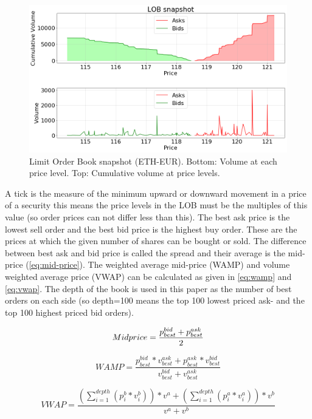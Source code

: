 \documentclass[11pt,a4paper,oneside]{article}
\begin{document}
  \begin{figure}[tbh]
    \centering
    \includegraphics[width=\textwidth]{lob_snapshot.png}
    \caption{Limit Order Book snapshot (ETH-EUR). Bottom: Volume at each price level. Top: Cumulative volume at price levels.}
    \label{fig:1}
  \end{figure}

  A tick is the measure of the minimum upward or downward movement in a price of a security this means the price levels 
  in the LOB must be the multiples of this value (so order prices can not differ less than this). The best ask price is 
  the lowest sell order and the best bid price is the highest buy order. These are the prices at which the given number 
  of shares can be bought or sold. The difference between best ask and bid price is called the spread and their average 
  is the mid-price (\ref{eq:mid-price}). The weighted average mid-price (WAMP) and volume weighted average price (VWAP) 
  can be calculated as given in \autoref{eq:wamp} and \autoref{eq:vwap}. The depth of the book is used in this paper as 
  the number of best orders on each side (so depth=100 means the top 100 lowest priced ask- and the top 100 highest 
  priced bid orders).

  \begin{equation}
    Mid\-price = \frac{p_{best}^{bid} + p_{best}^{ask}}{2}
    \label{eq:mid-price}
  \end{equation}

  \begin{equation}
    WAMP = \frac{p_{best}^{bid} * v_{best}^{ask} + p_{best}^{ask} * v_{best}^{bid}}{v_{best}^{bid} + v_{best}^{ask}}
    \label{eq:wamp}
  \end{equation}

  \begin{equation}
    VWAP = \frac{(\sum_{i=1}^{depth} (p_i^b * v_i^b))*v^a + (\sum_{i=1}^{depth} (p_i^a * v_i^a))*v^b}{v^a + v^b}
    \label{eq:vwap}
  \end{equation}
\end{document}
